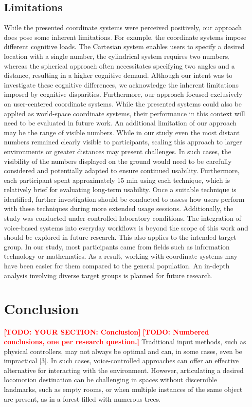 \documentclass[preprint,12pt]{elsarticle}
\newcommand{\reftext}[1]{{\color{gray}#1}}   %
\newcommand{\todo}[1]{\textcolor{red}{\textbf{[TODO: #1]}}}
\begin{document}
\subsection{Limitations}
\reftext{While the presented coordinate systems were perceived positively, our approach does pose some inherent limitations. For example, the coordinate systems impose different cognitive loads. The Cartesian system enables users to specify a desired location with a single number, the cylindrical system requires two numbers, whereas the spherical approach often necessitates specifying two angles and a distance, resulting in a higher cognitive demand. Although our intent was to investigate these cognitive differences, we acknowledge the inherent limitations imposed by cognitive disparities. Furthermore, our approach focused exclusively on user-centered coordinate systems. While the presented systems could also be applied as world-space coordinate systems, their performance in this context will need to be evaluated in future work. An additional limitation of our approach may be the range of visible numbers. While in our study even the most distant numbers remained clearly visible to participants, scaling this approach to larger environments or greater distances may present challenges. In such cases, the visibility of the numbers displayed on the ground would need to be carefully considered and potentially adapted to ensure continued usability. Furthermore, each participant spent approximately 15 min using each technique, which is relatively brief for evaluating long-term usability. Once a suitable technique is identified, further investigation should be conducted to assess how users perform with these techniques during more extended usage sessions. Additionally, the study was conducted under controlled laboratory conditions. The integration of voice-based systems into everyday workflows is beyond the scope of this work and should be explored in future research. This also applies to the intended target group. In our study, most participants came from fields such as information technology or mathematics. As a result, working with coordinate systems may have been easier for them compared to the general population. An in-depth analysis involving diverse target groups is planned for future research.}

\section{Conclusion}
\todo{YOUR SECTION: Conclusion}
\todo{Numbered conclusions, one per research question.}
\reftext{Traditional input methods, such as physical controllers, may not always be optimal and can, in some cases, even be impractical [3]. In such cases, voice-controlled approaches can offer an effective alternative for interacting with the environment. However, articulating a desired locomotion destination can be challenging in spaces without discernible landmarks, such as empty rooms, or when multiple instances of the same object are present, as in a forest filled with numerous trees.}
\end{document}
